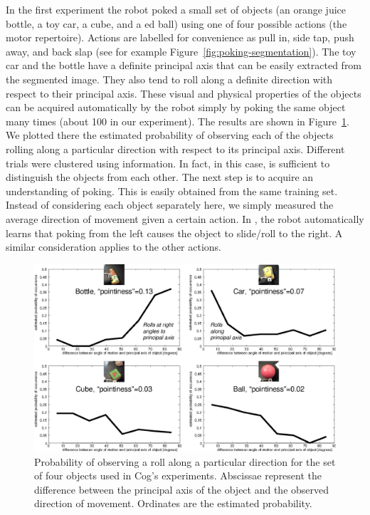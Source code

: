 In the first experiment the robot poked a small set of objects 
(an orange juice bottle, a toy car, a cube, and a \ahhcolor{}ed ball) using 
one of four possible actions (the motor repertoire). Actions are 
labelled for convenience as pull in, side tap, push away, and back 
slap (see for example Figure~\ref{fig:poking-segmentation}). 
The toy car and the bottle have a definite principal axis that 
can be easily extracted from the segmented image. They also tend to 
roll along a definite direction with respect to their principal axis. 
These visual and physical properties of the objects can be acquired 
automatically by the robot simply by poking the same object many times 
(about 100 in our experiment). The results are shown in 
Figure~\ref{fig:affordances}. We plotted there the estimated probability 
of observing each of the objects rolling along a particular direction 
with respect to its principal axis. Different trials were clustered 
using \ahhcolor{} information. In fact, in this case, \ahhcolor{} is sufficient
to distinguish the objects from each other. The next step is to
acquire an understanding of poking. This is easily obtained from 
the same training set. Instead of considering each object separately 
here, we simply measured the average direction of movement given a 
certain action. In \ahhpractice{}, the robot automatically learns that 
poking from the left causes the object to slide/roll to the right. 
A similar consideration applies to the other actions.

%
%
\begin{figure}[tb]
\begin{center}
\includegraphics[width=\columnwidth]{affordances.eps}
\caption{ 
\label{fig:affordances}
%
%
Probability of observing a roll along a particular direction for the set of
four objects used in Cog's experiments. Abscissae represent the difference
between the principal axis of the object and the observed direction of movement.
Ordinates are the estimated probability.
}
\end{center}
\end{figure}
%
%

